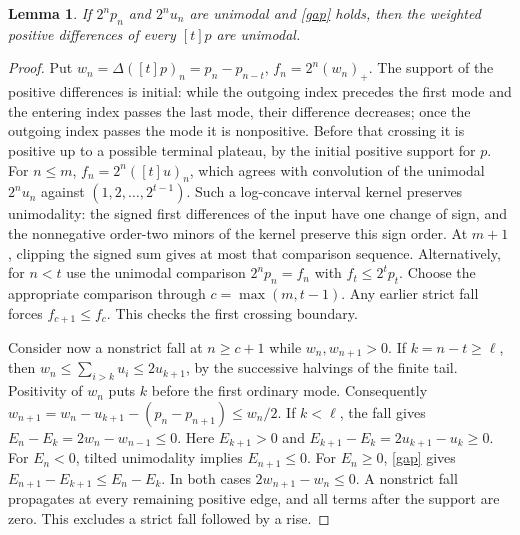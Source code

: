 \documentclass[11pt]{article}
\newtheorem{lemma}[proposition]{Lemma}
\begin{document}
\begin{lemma}\label{win}
If \(2^np_n\) and \(2^nu_n\) are unimodal and \eqref{gap} holds,
then the weighted positive differences of every \([t]p\) are unimodal.
\end{lemma}
\begin{proof}
Put \(w_n=\Delta([t]p)_n=p_n-p_{n-t}\), \(f_n=2^n(w_n)_+\).
The support of the positive differences is initial: while the outgoing
index precedes the first mode and the entering index passes the last
mode, their difference decreases; once the outgoing index passes the
mode it is nonpositive. Before that crossing it is positive up to a
possible terminal plateau, by the initial positive support for \(p\).
For \(n\le m\), \(f_n=2^n([t]u)_n\), which agrees with convolution of
the unimodal \(2^nu_n\) against \((1,2,\ldots,2^{t-1})\).
Such a log-concave interval kernel preserves unimodality: the signed
first differences of the input have one change of sign, and the
nonnegative order-two minors of the kernel preserve this sign order.
At \(m+1\), clipping the signed sum gives at most that comparison
sequence. Alternatively, for \(n<t\) use the unimodal comparison
\(2^np_n=f_n\) with \(f_t\le2^tp_t\). Choose the appropriate comparison
through \(c=\max(m,t-1)\). Any earlier strict fall forces
\(f_{c+1}\le f_c\). This checks the first crossing boundary.

Consider now a nonstrict fall at \(n\ge c+1\) while
\(w_n,w_{n+1}>0\). If \(k=n-t\ge\ell\), then
\(w_n\le\sum_{i>k}u_i\le2u_{k+1}\), by the successive halvings of
the finite tail. Positivity of \(w_n\) puts \(k\) before the first
ordinary mode. Consequently
\(
 w_{n+1}=w_n-u_{k+1}-(p_n-p_{n+1})\le w_n/2.
\)
If \(k<\ell\), the fall gives \(E_n-E_k=2w_n-w_{n-1}\le0\).
Here \(E_{k+1}>0\) and \(E_{k+1}-E_k=2u_{k+1}-u_k\ge0\).
For \(E_n<0\), tilted unimodality implies \(E_{n+1}\le0\).
For \(E_n\ge0\), \eqref{gap} gives \(E_{n+1}-E_{k+1}\le E_n-E_k\).
In both cases \(2w_{n+1}-w_n\le0\). A nonstrict fall propagates
at every remaining positive edge, and all terms after the support are
zero. This excludes a strict fall followed by a rise.
\end{proof}
\end{document}
